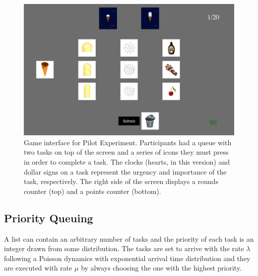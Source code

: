 \documentclass[
]{article}
\begin{document}
\begin{figure}

{\centering \includegraphics{images/totalice.jpeg}

}

\caption{\label{fig-pilot-exp}Game interface for Pilot Experiment.
Participants had a queue with two tasks on top of the screen and a
series of icons they must press in order to complete a task. The clocks
(hearts, in this version) and dollar signs on a task represent the
urgency and importance of the task, respectively. The right side of the
screen displays a rounds counter (top) and a points counter (bottom).}

\end{figure}

\newpage{}

\hypertarget{priority-queuing-1}{%
\subsection{Priority Queuing}\label{priority-queuing-1}}

A list can contain an arbitrary number of tasks and the priority of each
task is an integer drawn from some distribution. The tasks are set to
arrive with the rate \(\lambda\) following a Poisson dynamics with
exponential arrival time distribution and they are executed with rate
\(\mu\) by always choosing the one with the highest priority.
\end{document}
